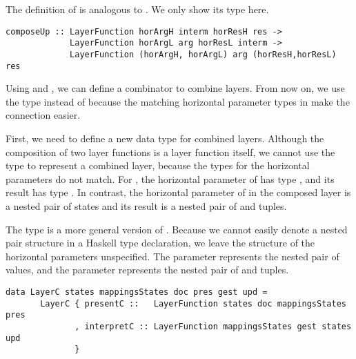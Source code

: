 


The definition of  is analogous to . We only show its type here.

\begin{small}
\begin{verbatim}
composeUp :: LayerFunction horArgH interm horResH res ->
             LayerFunction horArgL arg horResL interm ->
             LayerFunction (horArgH, horArgL) arg (horResH,horResL) res
\end{verbatim}
\end{small}


Using  and , we can define a combinator to combine  layers. 
\bc From now on, we use the type  instead of  because the matching horizontal parameter types in  make the connection easier. \ec


First, we need to define a new data type for combined layers. Although the composition of two layer functions is a layer function itself, we cannot use the type  to represent a combined layer, because the types for the horizontal parameters do not match.  For , the horizontal parameter of  has type , and its result has type . In contrast, the horizontal parameter of  in the composed layer is a nested pair of states and its result is a nested pair of  and  tuples. 

The type  is a more general version of . Because we cannot easily denote a nested pair structure in a Haskell type declaration, we leave the structure of the horizontal parameters unspecified. The parameter  represents the nested pair of  values, and the parameter  represents the nested pair of  and  tuples.

\begin{small}
\begin{verbatim}
data LayerC states mappingsStates doc pres gest upd =
       LayerC { presentC ::   LayerFunction states doc mappingsStates pres
              , interpretC :: LayerFunction mappingsStates gest states upd
              }
\end{verbatim}
\end{small}

